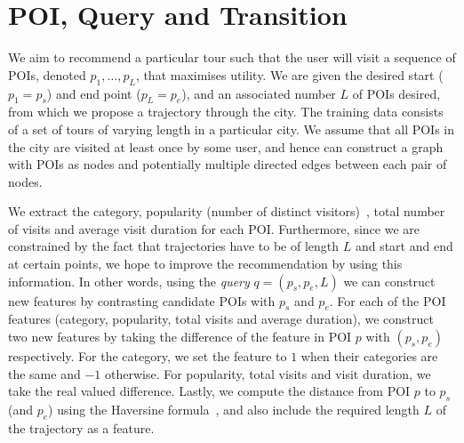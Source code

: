 \section{POI, Query and Transition}
\label{sec:feature}


We aim to recommend a particular tour such that the user will visit a sequence of POIs, denoted $p_1, \ldots, p_L$, that maximises utility. We are given the desired start ($p_1=p_s$) and end point ($p_L=p_e$), and an associated number $L$ of POIs desired, from which we propose a trajectory through the city.
%
%
The training data consists of a set of tours of varying length in a particular city. We assume that all POIs %
in the city are visited at least once by some user, and hence can construct a graph with POIs as nodes and potentially multiple directed edges between each pair of nodes. 




We extract the category, popularity (number of distinct visitors)~\cite{ht10}, total number of visits and average visit duration for each POI.
Furthermore, since we are constrained by the fact that trajectories have to be of length $L$ and start and end at certain points, we hope to improve the recommendation by using this information.
In other words, using the \textit{query} $q = (p_s, p_e, L)$ we can construct new features by contrasting candidate POIs with $p_s$ and $p_e$.
%
For each of the POI features (category, popularity, total visits and average duration),
we construct two new features by taking the difference of the feature in POI $p$ with $(p_s, p_e)$ respectively.
For the category, we set the feature to $1$ when their categories are the same and $-1$ otherwise.
For popularity, total visits and visit duration, we take the real valued difference.
Lastly, we compute the distance from POI $p$ to $p_s$ (and $p_e$) using the Haversine formula~\cite{haversine},
and also include the required length $L$ of the trajectory as a feature.



